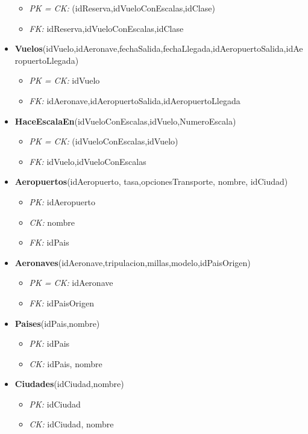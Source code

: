 \begin{itemize}
		\begin{itemize}
			\item \textit{PK = CK: } (idReserva,idVueloConEscalas,idClase)
			\item \textit{FK: } idReserva,idVueloConEscalas,idClase
		\end{itemize}
	\item \textbf{Vuelos}(idVuelo,idAeronave,fechaSalida,fechaLlegada,idAeropuertoSalida,idAeropuertoLlegada)
		\begin{itemize}
			\item \textit{PK = CK:} idVuelo
			\item \textit{FK: } idAeronave,idAeropuertoSalida,idAeropuertoLlegada
		\end{itemize}
	\item \textbf{HaceEscalaEn}(idVueloConEscalas,idVuelo,NumeroEscala)
		\begin{itemize}
			\item \textit{PK = CK:} (idVueloConEscalas,idVuelo)
			\item \textit{FK: } idVuelo,idVueloConEscalas
		\end{itemize}
	\item \textbf{Aeropuertos}(idAeropuerto,	tasa,opcionesTransporte, nombre, idCiudad)
		\begin{itemize}
			\item \textit{PK: } idAeropuerto
			\item \textit{CK: } nombre
			\item \textit{FK: } idPais
		\end{itemize}
	\item \textbf{Aeronaves}(idAeronave,tripulacion,millas,modelo,idPaisOrigen)
		\begin{itemize}
			\item \textit{PK = CK: } idAeronave
			\item \textit{FK: } idPaisOrigen
		\end{itemize}
	\item \textbf{Paises}(idPais,nombre)
		\begin{itemize}
			\item \textit{PK: } idPais
			\item \textit{CK: } idPais, nombre
		\end{itemize}
	\item \textbf{Ciudades}(idCiudad,nombre)
		\begin{itemize}
			\item \textit{PK: } idCiudad
			\item \textit{CK: } idCiudad, nombre

\end{itemize}
\end{itemize}

